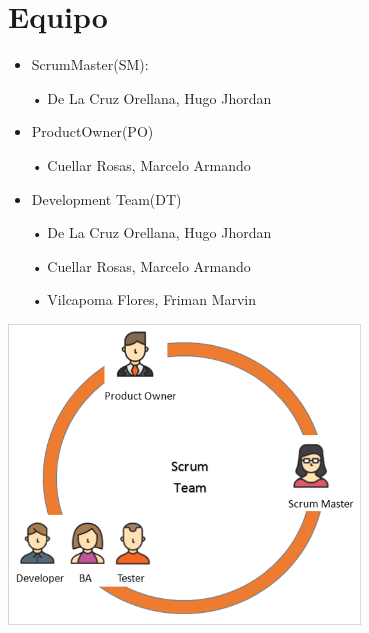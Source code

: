 
\chapter{Equipo}

\begin{itemize}
\item ScrumMaster(SM):

	• De La Cruz Orellana, Hugo Jhordan  
\item ProductOwner(PO)

	• Cuellar Rosas, Marcelo Armando
\item Development Team(DT)

	• De La Cruz Orellana, Hugo Jhordan
	
	• Cuellar Rosas, Marcelo Armando
	
	• Vilcapoma Flores, Friman Marvin	
\end{itemize}
	\centering
	\includegraphics[width=0.70\textwidth]{img/scrum_team}\par\vspace{1cm}


